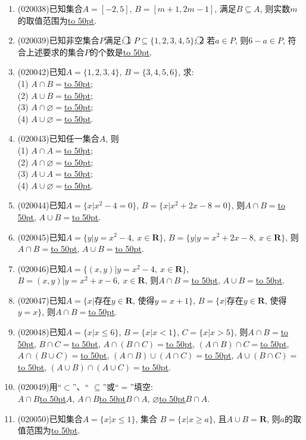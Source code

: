 \documentclass[10pt,a4paper]{article}
\newcommand{\blank}[1]{\underline{\hbox to #1pt{}}}
\begin{document}
\begin{enumerate}[1.]
\item {\tiny (020038)}已知集合$A=[-2,5]$, $B=[m+1,2m-1]$, 满足$B\subseteq A$, 则实数$m$的取值范围为\blank{50}.
\item {\tiny (020039)}已知非空集合$P$满足: \textcircled{1} $P\subseteq \{1,2,3,4,5\}$; \textcircled{2} 若$a\in P$, 则$6-a\in P$, 符合上述要求的集合$P$的个数是\blank{50}.
\item {\tiny (020042)}已知$A=\{1, 2, 3, 4\}$, $B=\{3, 4, 5, 6\}$, 求:\\
(1) $A\cap B=$\blank{50};\\
(2) $A\cup B=$\blank{50};\\
(3) $A\cap\varnothing=$\blank{50};\\
(4) $A\cup\varnothing=$\blank{50}.
\item {\tiny (020043)}已知任一集合$A$, 则\\
(1) $A\cap A=$\blank{50};\\
(2) $A\cap\varnothing=$\blank{50};\\
(3) $A\cup A=$\blank{50};\\
(4) $A\cup\varnothing=$\blank{50}.
\item {\tiny (020044)}已知$A=\{x|x^2-4=0\}$, $B=\{x|x^2+2x-8=0\}$, 则$A\cap B=$\blank{50}, $A\cup B=$\blank{50}.
\item {\tiny (020045)}已知$A=\{y|y=x^2-4, \ x\in\mathbf{R}\}$, $B=\{y|y=x^2+2x-8,\  x\in \mathbf{R}\}$, 则$A\cap B=$\blank{50}, $A\cup B=$\blank{50}.
\item {\tiny (020046)}已知$A=\{(x, y)|y=x^2-4, \ x\in \mathbf{R}\}$, $B={(x, y)|y=x^2+x-6, \  x\in\mathbf{R}}$, 则$A\cap B=$\blank{50}, $ A\cup B=$\blank{50}.
\item {\tiny (020047)}已知$A=\{x|$存在$y\in \mathbf{R}$, 使得$y=x+1\}$, $B=\{x|$存在$y\in \mathbf{R}$, 使得$y=x\}$, 则$A\cap B= $\blank{50}.
\item {\tiny (020048)}已知$A=\{x|x\le 6\}$, $B=\{x|x<1\}$, $C=\{x|x>5\}$, 则$A\cap B=$\blank{50}, $B\cap C=$\blank{50}, $A\cap(B\cap C)=$\blank{50}, $(A\cap B)\cap C=$\blank{50}, $A\cap(B\cup C)=$\blank{50}, $(A\cap B)\cup(A\cap C)=$\blank{50}, $A\cup(B\cap C)=$\blank{50}, $ (A\cup B)\cap(A\cup C)=$\blank{50}.
\item {\tiny (020049)}用``$\subset$''、`` $\subseteq$''或``$=$''填空:\\
$A\cap B$\blank{50}$A$, $A\cap B$\blank{50}$B\cap A$, $\varnothing$\blank{50}$B\cap A$.
\item {\tiny (020050)}已知集合$A=\{x| x\le 1\}$, 集合 $B=\{x| x\ge a\}$, 且$A\cup B=\mathbf{R}$, 则$a$的取值范围为\blank{50}.

\end{enumerate}
\end{document}
